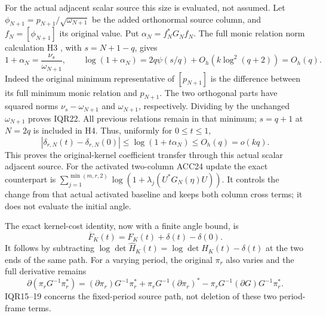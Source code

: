 \documentclass[11pt]{article}
\begin{document}
For the actual adjacent scalar source this size is evaluated, not
assumed. Let $\phi_{N+1}=p_{N+1}/\sqrt{\omega_{N+1}}$ be the added
orthonormal source column, and $f_N=[\phi_{N+1}]$ its original value.
Put $\alpha_N=f_N^*G_Nf_N$. The full monic relation norm calculation
H3 \cite{Profile}, with $s=N+1-q$, gives
\[
1+\alpha_N=\frac{\nu_s}{\omega_{N+1}},\qquad
\log(1+\alpha_N)=2q\psi(s/q)+O_h(k\log^2(q+2))=O_h(q).
\tag{IQR22}
\]
Indeed the original minimum representative of $[p_{N+1}]$ is the
difference between its full minimum monic relation and $p_{N+1}$.
The two orthogonal parts have squared norms
$\nu_s-\omega_{N+1}$ and $\omega_{N+1}$, respectively.
Dividing by the unchanged $\omega_{N+1}$ proves IQR22.
All previous relations remain in that minimum; $s=q+1$ at $N=2q$
is included in H4. Thus, uniformly for $0\le t\le1$,
\[
|\delta_{r,N}(t)-\delta_{r,N}(0)|
\le\log(1+t\alpha_N)\le O_h(q)=o(kq).
\tag{IQR23}
\]
This proves the original-kernel coefficient transfer through this
actual scalar adjacent source. For the activated two-column
ACC24 update the exact counterpart is
$\sum_{j=1}^{\min(m,r,2)}\log(1+\lambda_j(U^*G_N(\eta)U))$.
It controls the change from that actual activated baseline and keeps
both column cross terms; it does not evaluate the initial angle.

The exact kernel-cost identity, now with a finite angle bound, is
\[
\overline F_K(t)=F_K(t)+\delta(t)-\delta(0).
\tag{IQR19}
\]
It follows by subtracting
$\log\det\widehat H_K(t)=\log\det H_K(t)-\delta(t)$ at the
two ends of the same path. For a varying period, the original
$\pi_r$ also varies and the full derivative remains
\[
\partial(\pi_rG^{-1}\pi_r^*)=
(\partial\pi_r)G^{-1}\pi_r^*
+\pi_rG^{-1}(\partial\pi_r)^*
-\pi_rG^{-1}(\partial G)G^{-1}\pi_r^*.
\]
IQR15--19 concerns the fixed-period source path, not deletion of
these two period-frame terms.
\end{document}
